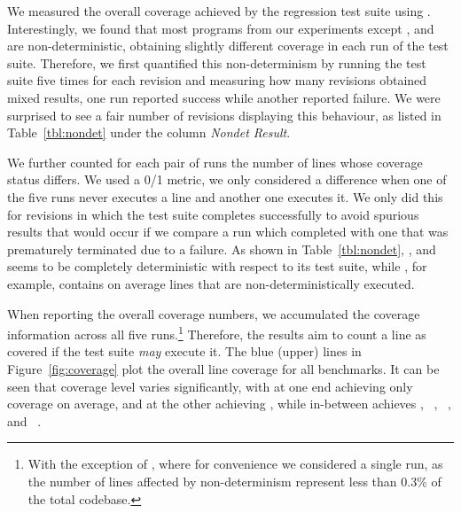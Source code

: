 We measured the overall coverage achieved by the regression test suite using
\gcov.  Interestingly, we found that most programs from our experiments except
\binutils, \lighttpd and \vim are non-deterministic, obtaining slightly
different coverage in each run of the test suite.  Therefore, we first
quantified this non-determinism by running the test suite five times for each
revision and measuring how many revisions obtained mixed results, \ie one run
reported success while another reported failure.  We were surprised to see a
fair number of revisions displaying this behaviour, as listed in
Table~\ref{tbl:nondet} under the column \textit{Nondet Result}.


We further counted for each pair of runs the number of lines whose
coverage status differs. We used a 0/1 metric, \ie we only considered
a difference when one of the five runs never executes a line and
another one executes it. We only did this for revisions in which the
test suite completes successfully to avoid spurious results that would
occur if we compare a run which completed with one that was
prematurely terminated due to a failure.  As shown in Table~\ref{tbl:nondet},
\binutils, \lighttpd and \vim seems to be completely deterministic with respect
to its test suite, while \redis, for example, contains on average
\redisNonDetAverage lines that are non-deterministically executed.

When reporting the overall coverage numbers, we accumulated the
coverage information across all five runs.\footnote{With the exception
of \git, where for convenience we considered a single run, as the
number of lines affected by non-determinism represent less than
$0.3\%$ of the total codebase.} Therefore, the results aim to count a
line as covered if the test suite {\em may} execute it.  The blue
(upper) lines in Figure~\ref{fig:coverage} plot the overall line
coverage for all benchmarks.  It can be seen that coverage level
varies significantly, with \beanstalkd at one end achieving
only \beanstalkdCoverageAverage coverage on average, and \git at the
other achieving
\gitCoverageAverage, while in-between \lighttpdtwo achieves
\lighttpdtwoCoverageAverage, \redis~\redisCoverageAverage,
\zeromq~\zeromqCoverageAverage, and
\memcached~\memcachedCoverageAverage.

